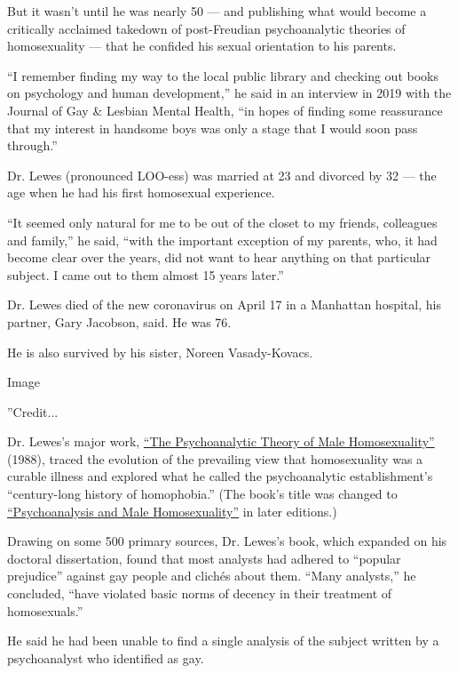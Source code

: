 But it wasn't until he was nearly 50 --- and publishing what would
become a critically acclaimed takedown of post-Freudian psychoanalytic
theories of homosexuality --- that he confided his sexual orientation to
his parents.

``I remember finding my way to the local public library and checking out
books on psychology and human development,'' he said in an interview in
2019 with the Journal of Gay \& Lesbian Mental Health, ``in hopes of
finding some reassurance that my interest in handsome boys was only a
stage that I would soon pass through.''

Dr. Lewes (pronounced LOO-ess) was married at 23 and divorced by 32 ---
the age when he had his first homosexual experience.

``It seemed only natural for me to be out of the closet to my friends,
colleagues and family,'' he said, ``with the important exception of my
parents, who, it had become clear over the years, did not want to hear
anything on that particular subject. I came out to them almost 15 years
later.''

Dr. Lewes died of the new coronavirus on April 17 in a Manhattan
hospital, his partner, Gary Jacobson, said. He was 76.

He is also survived by his sister, Noreen Vasady-Kovacs.

Image

''Credit...

Dr. Lewes's major work,
\href{https://www.nytimes3xbfgragh.onion/1988/12/11/books/navigating-the-straits-of-oedipus.html}{``The
Psychoanalytic Theory of Male Homosexuality''} (1988), traced the
evolution of the prevailing view that homosexuality was a curable
illness and explored what he called the psychoanalytic establishment's
``century-long history of homophobia.'' (The book's title was changed to
\href{https://catalog.loc.gov/vwebv/search?searchCode=LCCN\&searchArg=2008944236\&searchType=1\&permalink=y}{``Psychoanalysis
and Male Homosexuality''} in later editions.)

Drawing on some 500 primary sources, Dr. Lewes's book, which expanded on
his doctoral dissertation, found that most analysts had adhered to
``popular prejudice'' against gay people and clichés about them. ``Many
analysts,'' he concluded, ``have violated basic norms of decency in
their treatment of homosexuals.''

He said he had been unable to find a single analysis of the subject
written by a psychoanalyst who identified as gay.

